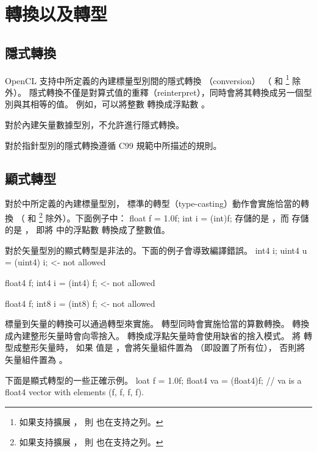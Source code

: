 \section[sec:conversionCast]{轉換以及轉型}

\subsection[sec:implicityConversion]{隱式轉換}

OpenCL 支持中所定義的內建標量型別間的隱式轉換
（conversion）
（ 和 \footnote{如果支持擴展 ，
則  也在支持之列。} 除外）。
隱式轉換不僅是對算式值的重釋（reinterpret），同時會將其轉換成另一個型別與其相等的值。
例如，可以將整數  轉換成浮點數 。

對於內建矢量數據型別，不允許進行隱式轉換。

對於指針型別的隱式轉換遵循 C99 規範中所描述的規則。

\subsection{顯式轉型}

對於中所定義的內建標量型別，
標準的轉型（type-casting）動作會實施恰當的轉換
（ 和 \footnote{如果支持擴展 ，
則  也在支持之列。} 除外）。下面例子中：
\startclc
float	f = 1.0f;
int	i = (int)f;
\stopclc
{} 存儲的是 ，而  存儲的是 ，
即將  中的浮點數  轉換成了整數值。

對於矢量型別的顯式轉型是非法的。下面的例子會導致編譯錯誤。
\startclc
int4	i;
uint4	u = (uint4) i;	<- not allowed

float4	f;
int4	i = (int4) f;	<- not allowed

float4	f;
int8	i = (int8) f;	<- not allowed
\stopclc

標量到矢量的轉換可以通過轉型來實施。
轉型同時會實施恰當的算數轉換。
轉換成內建整形矢量時會向零捨入。
轉換成浮點矢量時會使用缺省的捨入模式。
將  轉型成整形矢量時，
如果  值是 ，會將矢量組件置為  （即設置了所有位），
否則將矢量組件置為 。

下面是顯式轉型的一些正確示例。
\startclc
loat	f = 1.0f;
float4	va = (float4)f;
// va is a float4 vector with elements (f, f, f, f).

